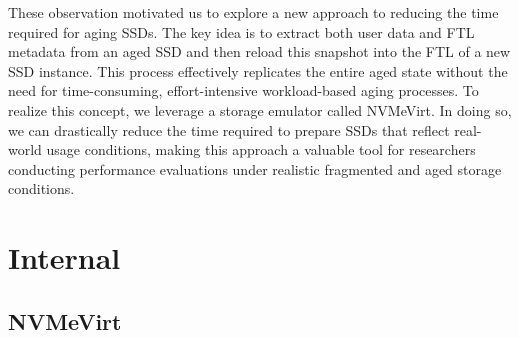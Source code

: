 These observation motivated us to explore a new approach to reducing the time required for aging SSDs.
The key idea is to extract both user data and FTL metadata from an aged SSD and then reload this snapshot into the FTL of a new SSD instance.
This process effectively replicates the entire aged state without the need for time-consuming, effort-intensive workload-based aging processes.
To realize this concept, we leverage a storage emulator called NVMeVirt.
In doing so, we can drastically reduce the time required to prepare SSDs that reflect real-world usage conditions, making this approach a valuable tool for researchers conducting performance evaluations under realistic fragmented and aged storage conditions.


\section{Internal}\label{s:internal}

\subsection{NVMeVirt}

